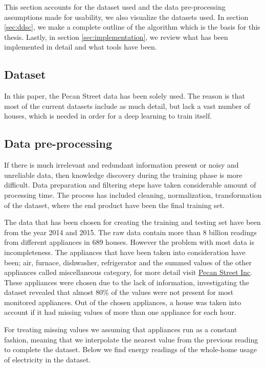 This section accounts for the dataset used and the data pre-processing assumptions made for usability, we also visualize the datasets used. In section \ref{sec:ddsc}, we make a complete outline of the algorithm which is the basis for this thesis. Lastly, in section \ref{sec:implementation}, we review what has been implemented in detail and what tools have been.


\subsection{Dataset}

In this paper, the Pecan Street data \cite{pecan} has been solely used. The reason is that most of the current datasets include as much detail, but lack a vast number of houses, which is needed in order for a deep learning to train itself.

\subsection{Data pre-processing}
\label{sec:prep}
If there is much irrelevant and redundant information present or noisy and unreliable data, then knowledge discovery during the training phase is more difficult. Data preparation and filtering steps have taken considerable amount of processing time. The process has included cleaning, normalization, transformation of the dataset, where the end product have been the final training set.

The data that has been chosen for creating the training and testing set have been from the year 2014 and 2015. The raw data contain more than 8 billion readings from different appliances in 689 houses. However the problem with most data is incompleteness. The appliances that have been taken into consideration have been; air, furnace, dishwasher, refrigerator and the summed values of the other appliances called miscellaneous category, for more detail visit \href{http://www.pecanstreet.org/}{Pecan Street Inc}. These appliances were chosen due to the lack of information, investigating the dataset revealed that almost 80\% of the values were not present for most monitored appliances. Out of the chosen appliances, a house was taken into account if it had missing values of more than one appliance for each hour. 

For treating missing values we assuming that appliances run as a constant fashion, meaning that we interpolate the nearest value from the previous reading to complete the dataset. Below we find energy readings of the whole-home usage of electricity in the dataset.

